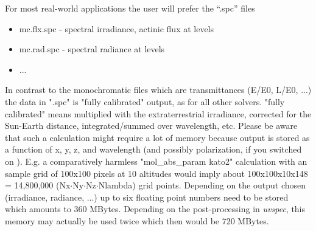 For most real-world applications the user will prefer the ``.spc'' files

\begin{itemize}
 \item mc.flx.spc - spectral irradiance, actinic flux at levels
 \item mc.rad.spc - spectral radiance at levels
 \item ...
\end{itemize}

In contrast to the monochromatic files which are transmittances (E/E0, L/E0,
...) the data in ".spc" is "fully calibrated" output, as for all other
solvers. "fully calibrated" means multiplied with the extraterrestrial 
irradiance, corrected for the Sun-Earth distance, integrated/summed
over wavelength, etc. Please be aware that such a calculation might require
a lot of memory because output is stored as a function of x, y, z, and
wavelength (and possibly polarization, if you switched on ).
E.g. a comparatively harmless "mol\_abs\_param kato2" calculation with an sample grid of 100x100 pixels
at 10 altitudes would imply about 100x100x10x148 = 14,800,000 (Nx$\cdot$Ny$\cdot$Nz$\cdot$Nlambda) grid points. Depending 
on the output chosen (irradiance, radiance, ...) up to six floating 
point numbers need to be stored which amounts to 360 MBytes. Depending 
on the post-processing in {\sl uvspec}, this memory may actually be used 
twice which then would be 720 MBytes. 

